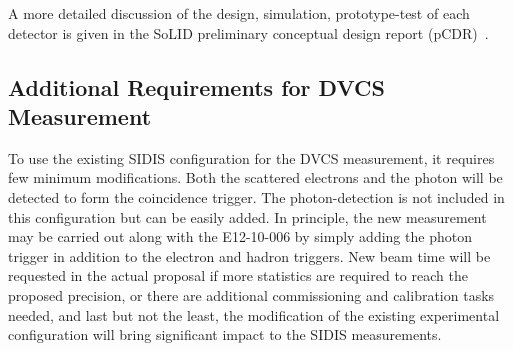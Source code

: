 A more detailed discussion of the design, simulation, prototype-test of each detector is given in the SoLID preliminary conceptual design report (pCDR)~\cite{solid_pcdr}. 

\subsection{Additional Requirements for DVCS Measurement}
To use the existing SIDIS configuration for the DVCS measurement, it requires few minimum modifications. Both the scattered electrons and the photon will be detected to form the coincidence trigger. The photon-detection is not included in this configuration but can be easily added. In principle, the new measurement may be carried out along with the E12-10-006 by simply adding the photon trigger in addition to the electron and hadron triggers. New beam time will be requested in the actual proposal if more statistics are required to reach the proposed precision, or there are additional commissioning and calibration tasks needed, and last but not the least, the modification of the existing experimental configuration will bring significant impact to the SIDIS measurements. 
